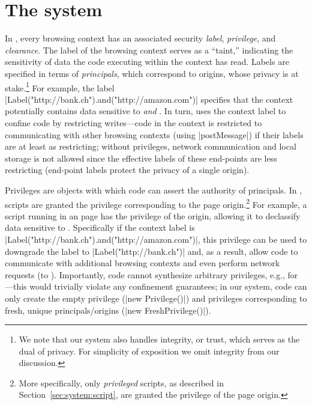 \section{The \sys{} system}
\label{sec:system}

In \sys, every browsing context has an associated security \emph{label},
\emph{privilege}, and \emph{clearance}.
%
The label of the browsing context serves as a ``taint,'' indicating
the sensitivity of data the code executing within the context has
read.
%
Labels are specified in terms of \emph{principals}, which
correspond to origins, whose privacy is at stake.\footnote{
  We note that our system also handles integrity, or trust, which
  serves as the dual of privacy.
  For simplicity of exposition we omit integrity from our discussion.
}
%
For example, the label
\js|Label("http://bank.ch").and("http://amazon.com")| specifies that
the context potentially contains data sensitive to 
\emph{and} .
%
In turn, \sys{} uses the context label to confine code by restricting
writes---code in the context is restricted to communicating with other
browsing contexts (using \js|postMessage|) if their labels are at
least as restricting; without privileges, network communication and
local storage is not allowed since the effective labels of these
end-points are less restricting (end-point labels protect the privacy
of a single origin).

Privileges are objects with which code can assert the authority of
principals. 
%
In \sys, scripts are granted the privilege corresponding to the
page origin.\footnote{
More specifically, only \emph{privileged} scripts, as described in
Section~\ref{sec:system:script}, are granted the privilege of the page
origin.
}
For example, a script running in an  page has the
privilege of the origin, allowing it to declassify data sensitive to
.
%
Specifically if the context label is
\js|Label("http://bank.ch").and("http://amazon.com")|, this privilege
can be used to downgrade the label to \js|Label("http://bank.ch")|
and, as a result, allow code to communicate with additional browsing
contexts and even perform network requests (to ).
%
Importantly, code cannot synthesize arbitrary privileges, e.g., for
---this would trivially violate any confinement
guarantees;
%
in our system, code can only create the empty privilege
(\js|new Privilege()|) 
and privileges corresponding to fresh, unique principals/origins
(\js|new FreshPrivilege()|).

